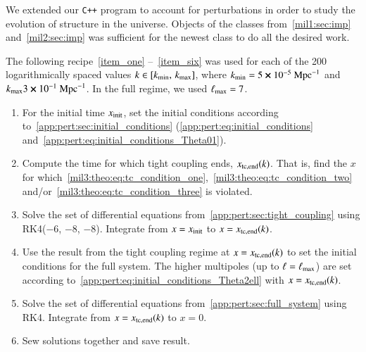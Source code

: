 


We extended our \verb|C++| program to account for perturbations in order to study the evolution of structure in the universe. Objects of the classes from~\cref{mil1:sec:imp} and~\cref{mil2:sec:imp} was sufficient for the newest class to do all the desired work. 



The following recipe~\ref{item_one} --~\ref{item_six} was used for each of the 200 logarithmically spaced values $k\in [k_\mathrm{min},\, k_\mathrm{max}]$, where $k_\mathrm{min} = 5\cross10^{-5}~\mathrm{Mpc}^{-1}$ and $k_\mathrm{max}3\cross 10^{-1}~\mathrm{Mpc}^{-1}$. In the full regime, we used $\ell_\mathrm{max}=7$.

\begin{enumerate}[wide,labelwidth=!,labelindent=0pt,label=(\roman*)]
    \item\label{item_one} 
    For the initial time $x_\mathrm{init}$, set the initial conditions according to~\cref{app:pert:sec:initial_conditions} (\cref{app:pert:eq:initial_conditions} and~\eqref{app:pert:eq:initial_conditions_Theta01}). 

    \item\label{item_two} 
    
    Compute the time for which tight coupling ends, $x_\mathrm{tc,end}(k)$. That is, find the $x$ for which~\cref{mil3:theo:eq:tc_condition_one},~\eqref{mil3:theo:eq:tc_condition_two} and/or~\eqref{mil3:theo:eq:tc_condition_three} is violated. 
    
    \item\label{item_three}
    
    Solve the set of differential equations from~\cref{app:pert:sec:tight_coupling} using RK4($-6$, $-8$, $-8$). Integrate from $x=x_\mathrm{init}$ to $x=x_\mathrm{tc,end}(k)$.

    \item\label{item_four}
    
    Use the result from the tight coupling regime at $x=x_\mathrm{tc,end}(k)$ to set the initial conditions for the full system. The higher multipoles (up to $\ell=\ell_\mathrm{max}$) are set according to~\cref{app:pert:eq:initial_conditions_Theta2ell} with $x=x_\mathrm{tc,end}(k)$. 

    \item\label{item_five}
    
    Solve the set of differential equations from~\cref{app:pert:sec:full_system} using RK4. Integrate from $x=x_\mathrm{tc,end}(k)$ to $x=0$. 

    \item\label{item_six}
    
    Sew solutions together and save result.

\end{enumerate}
 

